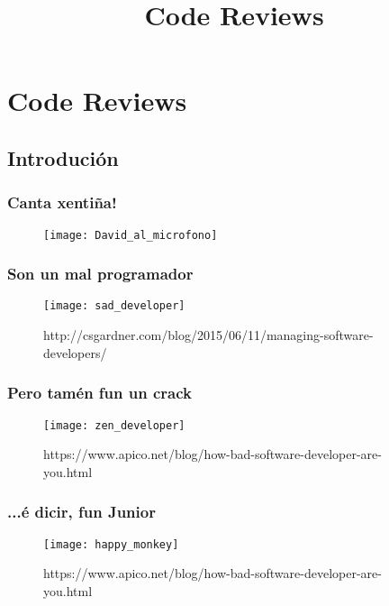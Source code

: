 
\title[Code Reviews]{Code Reviews}
\date{}
\author[Pepe Doval]{}
\institute{}

\section{Code Reviews}
\label{sec:CodeReviews}

\usebackgroundtemplate{}
\begin{frame}
  \titlepage
\end{frame}


\subsection{Introdución}
\label{subsec:Introducion}

\begin{frame}
  \frametitle{Canta xentiña!}
  \begin{figure}[ht]
    \texttt{[image: David\_al\_microfono]}
  \end{figure}
\end{frame}

\begin{frame}
  \frametitle{Son un mal programador}
  \begin{figure}[ht]
    \texttt{[image: sad\_developer]}
    \caption{http://csgardner.com/blog/2015/06/11/managing-software-developers/}
  \end{figure}
\end{frame}

\begin{frame}
  \frametitle{Pero tamén fun un crack}
  \begin{figure}[ht]
    \texttt{[image: zen\_developer]}
    \caption{https://www.apico.net/blog/how-bad-software-developer-are-you.html}
  \end{figure}
\end{frame}

\begin{frame}
  \frametitle{...é dicir, fun Junior}
  \begin{figure}[ht]
    \texttt{[image: happy\_monkey]}
    \caption{https://www.apico.net/blog/how-bad-software-developer-are-you.html}
  \end{figure}
\end{frame}

